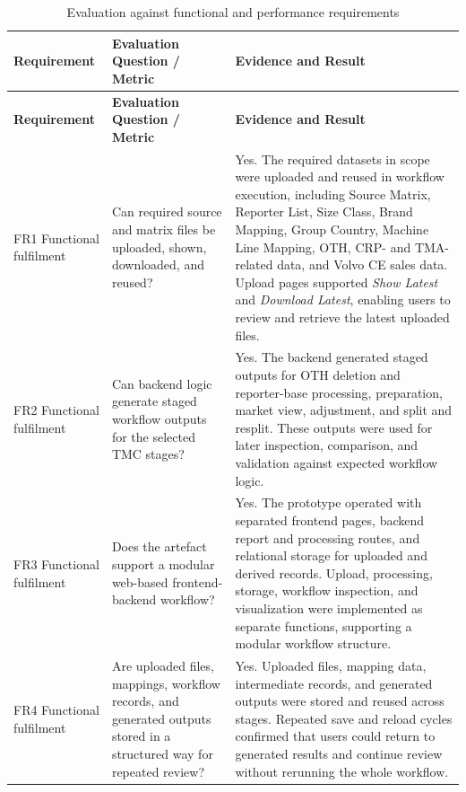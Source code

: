 \setlength{\tabcolsep}{4pt}
\small
\begin{longtable}{|>{\raggedright\arraybackslash}p{2.2cm}|>{\raggedright\arraybackslash}p{3.0cm}|>{\raggedright\arraybackslash}p{5.7cm}|}
\caption{Evaluation against functional and performance requirements}
\label{tab:evaluation_parameters} \\
\hline
\textbf{Requirement} & \textbf{Evaluation Question / Metric} & \textbf{Evidence and Result} \\
\hline
\endfirsthead

\hline
\textbf{Requirement} & \textbf{Evaluation Question / Metric} & \textbf{Evidence and Result} \\
\hline
\endhead

FR1 Functional fulfilment & Can required source and matrix files be uploaded, shown, downloaded, and reused? & Yes. The required datasets in scope were uploaded and reused in workflow execution, including Source Matrix, Reporter List, Size Class, Brand Mapping, Group Country, Machine Line Mapping, OTH, CRP- and TMA-related data, and Volvo CE sales data. Upload pages supported \textit{Show Latest} and \textit{Download Latest}, enabling users to review and retrieve the latest uploaded files. \\
\hline

FR2 Functional fulfilment & Can backend logic generate staged workflow outputs for the selected TMC stages? & Yes. The backend generated staged outputs for OTH deletion and reporter-base processing, preparation, market view, adjustment, and split and resplit. These outputs were used for later inspection, comparison, and validation against expected workflow logic. \\
\hline

FR3 Functional fulfilment & Does the artefact support a modular web-based frontend-backend workflow? & Yes. The prototype operated with separated frontend pages, backend report and processing routes, and relational storage for uploaded and derived records. Upload, processing, storage, workflow inspection, and visualization were implemented as separate functions, supporting a modular workflow structure. \\
\hline

FR4 Functional fulfilment & Are uploaded files, mappings, workflow records, and generated outputs stored in a structured way for repeated review? & Yes. Uploaded files, mapping data, intermediate records, and generated outputs were stored and reused across stages. Repeated save and reload cycles confirmed that users could return to generated results and continue review without rerunning the whole workflow. \\
\hline


\end{longtable}
